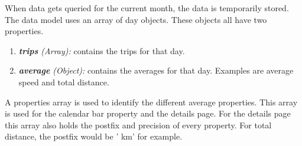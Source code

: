 When data gets queried for the current month, the data is temporarily stored. The data
model uses an array of day objects. These objects all have two properties.
\begin{enumerate}
	\item \textit{\textbf{trips} (Array):} contains the trips for that day.
	\item \textit{\textbf{average} (Object):} contains the averages for that day.
	Examples are average speed and total distance.
\end{enumerate}
A properties array is used to identify the different average properties. This array
is used for the calendar bar property and the details page. For the details page this
array also holds the postfix and precision of every property. For total distance, the
postfix would be ' km' for example.